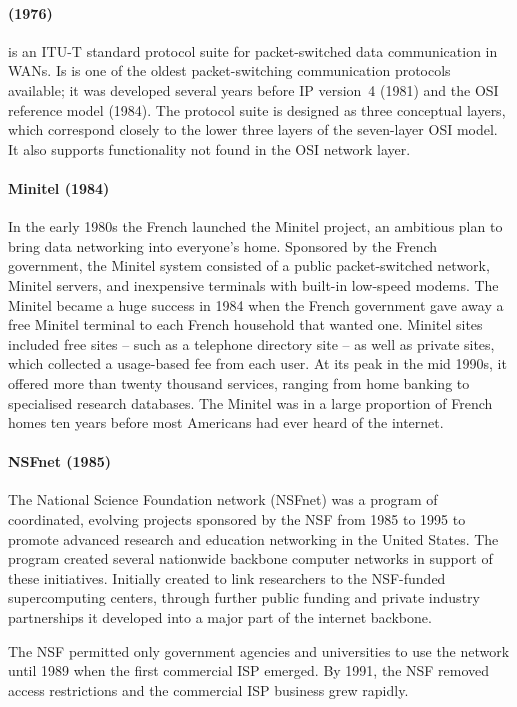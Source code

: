 {\paragraph{ (1976)}
 is an \acs{ITU-T} standard protocol suite for packet-switched data communication in \aclp{WAN}.
Is is one of the oldest packet-switching communication protocols available; it was developed several years before \gls{IP} version~4 (1981) and the \gls{OSI} reference model (1984).
The protocol suite is designed as three conceptual layers, which correspond closely to the lower three layers of the seven-layer \gls{OSI} model.
It also supports functionality not found in the \gls{OSI} network layer.

\paragraph{Minitel (1984)}
In the early 1980s the French launched the Minitel project, an ambitious plan to bring data networking into everyone’s home.
Sponsored by the French government, the Minitel system consisted of a public packet-switched network, Minitel servers, and inexpensive terminals with built-in low-speed modems.
The Minitel became a huge success in 1984 when the French government gave away a free Minitel terminal to each French household that wanted one.
Minitel sites included free sites -- such as a telephone directory site -- as well as private sites, which collected a usage-based fee from each user.
At its peak in the mid 1990s, it offered more than twenty thousand services, ranging from home banking to specialised research databases.
The Minitel was in a large proportion of French homes ten years before most Americans had ever heard of the internet.

\paragraph{NSFnet (1985)}
The National Science Foundation network (NSFnet) was a program of coordinated, evolving projects sponsored by the \gls{NSF} from 1985 to 1995 to promote advanced research and education networking in the United States.
The program created several nationwide backbone computer networks in support of these initiatives.
Initially created to link researchers to the \gls{NSF}-funded supercomputing centers, through further public funding and private industry partnerships it developed into a major part of the internet backbone.

The \acl{NSF} permitted only government agencies and universities to use the network until 1989 when the first commercial \acl{ISP} emerged.
By 1991, the \acs{NSF} removed access restrictions and the commercial \acs{ISP} business grew rapidly.

}
